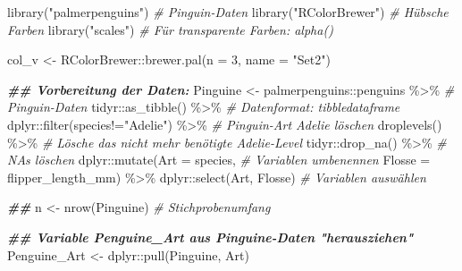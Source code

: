 \documentclass[
  ngerman,
]{book}
\newenvironment{Shaded}{\begin{snugshade}}{\end{snugshade}}
\newcommand{\AttributeTok}[1]{\textcolor[rgb]{0.77,0.63,0.00}{#1}}
\newcommand{\CommentTok}[1]{\textcolor[rgb]{0.56,0.35,0.01}{\textit{#1}}}
\newcommand{\DecValTok}[1]{\textcolor[rgb]{0.00,0.00,0.81}{#1}}
\newcommand{\DocumentationTok}[1]{\textcolor[rgb]{0.56,0.35,0.01}{\textbf{\textit{#1}}}}
\newcommand{\FunctionTok}[1]{\textcolor[rgb]{0.00,0.00,0.00}{#1}}
\newcommand{\NormalTok}[1]{#1}
\newcommand{\OtherTok}[1]{\textcolor[rgb]{0.56,0.35,0.01}{#1}}
\newcommand{\SpecialCharTok}[1]{\textcolor[rgb]{0.00,0.00,0.00}{#1}}
\newcommand{\StringTok}[1]{\textcolor[rgb]{0.31,0.60,0.02}{#1}}
\begin{document}
\begin{Shaded}
\begin{Highlighting}[]
\FunctionTok{library}\NormalTok{(}\StringTok{"palmerpenguins"}\NormalTok{) }\CommentTok{\# Pinguin{-}Daten}
\FunctionTok{library}\NormalTok{(}\StringTok{"RColorBrewer"}\NormalTok{)   }\CommentTok{\# Hübsche Farben}
\FunctionTok{library}\NormalTok{(}\StringTok{"scales"}\NormalTok{)         }\CommentTok{\# Für transparente Farben: alpha()}

\NormalTok{col\_v }\OtherTok{\textless{}{-}}\NormalTok{ RColorBrewer}\SpecialCharTok{::}\FunctionTok{brewer.pal}\NormalTok{(}\AttributeTok{n =} \DecValTok{3}\NormalTok{, }\AttributeTok{name =} \StringTok{"Set2"}\NormalTok{)}

\DocumentationTok{\#\# Vorbereitung der Daten:}
\NormalTok{Pinguine }\OtherTok{\textless{}{-}}\NormalTok{ palmerpenguins}\SpecialCharTok{::}\NormalTok{penguins }\SpecialCharTok{\%\textgreater{}\%} \CommentTok{\# Pinguin{-}Daten}
\NormalTok{  tidyr}\SpecialCharTok{::}\FunctionTok{as\_tibble}\NormalTok{() }\SpecialCharTok{\%\textgreater{}\%}                 \CommentTok{\# Datenformat: \textquotesingle{}tibble\textquotesingle{}{-}dataframe}
\NormalTok{  dplyr}\SpecialCharTok{::}\FunctionTok{filter}\NormalTok{(species}\SpecialCharTok{!=}\StringTok{"Adelie"}\NormalTok{) }\SpecialCharTok{\%\textgreater{}\%}   \CommentTok{\# Pinguin{-}Art \textquotesingle{}Adelie\textquotesingle{} löschen }
  \FunctionTok{droplevels}\NormalTok{() }\SpecialCharTok{\%\textgreater{}\%}                       \CommentTok{\# Lösche das nicht mehr benötigte Adelie{-}Level}
\NormalTok{  tidyr}\SpecialCharTok{::}\FunctionTok{drop\_na}\NormalTok{() }\SpecialCharTok{\%\textgreater{}\%}                   \CommentTok{\# NAs löschen}
\NormalTok{  dplyr}\SpecialCharTok{::}\FunctionTok{mutate}\NormalTok{(}\AttributeTok{Art    =}\NormalTok{ species,        }\CommentTok{\# Variablen umbenennen}
                \AttributeTok{Flosse =}\NormalTok{ flipper\_length\_mm) }\SpecialCharTok{\%\textgreater{}\%} 
\NormalTok{  dplyr}\SpecialCharTok{::}\FunctionTok{select}\NormalTok{(Art, Flosse)             }\CommentTok{\# Variablen auswählen}

\DocumentationTok{\#\#  }
\NormalTok{n      }\OtherTok{\textless{}{-}} \FunctionTok{nrow}\NormalTok{(Pinguine)                 }\CommentTok{\# Stichprobenumfang}

\DocumentationTok{\#\# Variable \textquotesingle{}Penguine\_Art\textquotesingle{} aus Pinguine{-}Daten "herausziehen"}
\NormalTok{Penguine\_Art    }\OtherTok{\textless{}{-}}\NormalTok{ dplyr}\SpecialCharTok{::}\FunctionTok{pull}\NormalTok{(Pinguine, Art)}


\end{Highlighting}
\end{Shaded}
\end{document}
